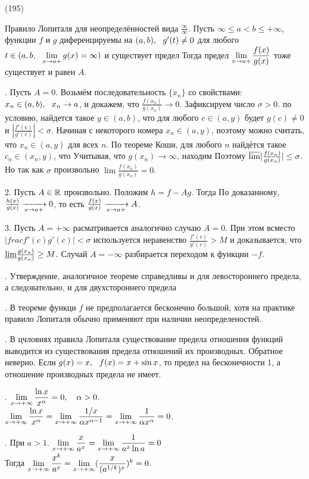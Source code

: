(195)

\T \q Правило Лопиталя для неопределённостей вида $\frac \infty\infty$. Пусть $\infty \le a < b \le +\infty$, функции $f$ и $g$ диференцируемы на $(a, b),\ \  g'(t) \neq 0$ для любого $t \in (a, b,\ \  \displaystyle \lim\limits^{}_{x \to a+}g(x) = \infty)$ и существует предел  Тогда предел $\displaystyle \lim\limits^{}_{x \to a+} \frac{f(x)}{g(x)}$ тоже существует и равен $A$.

. Пусть $A = 0$. Возьмём последовательность $\{x_n\}$ со свойствами: $x_n \in (a, b),\ \  x_n \to a$, и докажем, что $\frac{f(x_n)}{g(x_n)}\to 0$. Зафиксируем число $\sigma > 0$. по условию, найдется такое $y \in (a, b)$, что для любого $c \in (a, y)$ будет $g(c)\neq 0$ и $|\frac{f'(с)}{g'(c)}| < \sigma$. Начиная с некоторого номера $x_n \in (a, y)$, поэтому можно считать, что $x_n \in (a, y)$ для всех $n$. По теореме Коши, для любого $n$ найдётся такое $c_n \in (x_n, y)$, что
 Учитывая, что $g(x_n) \to \infty$, находим  Поэтому $\overline{\lim} |\frac{f(x_n)}{g(x_n)}| \le \sigma$. Но так как $\sigma$ произвольно $\lim\frac{f(x_n)}{g(x_n)} = 0$.

2. Пусть $A \in \mathbb{R}$ произвольно. Положим $h = f - Ag$. Тогда  По доказанному, $\frac{h(x)}{g(x)} \xrightarrow[x\to a+]{} 0$, то есть $\frac{f(x)}{g(x)} \xrightarrow[x\to a+]{} A$.

3. Пусть $A = +\infty$ расматривается аналогично случаю $A = 0$. При этом всместо $|frac{f'(c)}{g'(c)}| < \sigma$ используется неравенство $\frac{f'(c)}{g'(c)} > M$ и доказывается, что $\underline{\lim} \frac{g(x_n)}{g(x_n)} \ge M$. Случай $A = -\infty$ разбирается переходом к функции $-f$.

. Утверждение, аналогичное теореме справедливы и для левостороннего предела, а следовательно, и для двухстороннего предела

. В теореме функци $f$ не предполагается бесконечно большой, хотя на практике правило Лопиталя обычно применяют при наличии неопределеностей.

. В цчловиях правила Лопиталя существование предела отношения функций выводится из существования предела отношений их производных. Обратное неверно. Если $g(x) = x,\ \  f(x) = x + \sin x$, то предел на бесконечности 1, а отношение производных предела не имеет.

. $\displaystyle \lim\limits^{}_{x \to +\infty} \frac{\ln x}{x^\alpha} = 0,\quad \alpha > 0$.\\
$\displaystyle \lim\limits^{}_{x \to +\infty} \frac{\ln x}{x^\alpha} = \displaystyle \lim\limits^{}_{x \to +\infty} \frac{1/x}{\alpha x^{\alpha - 1}} = \displaystyle \lim\limits^{}_{x \to +\infty} \frac 1{\alpha x^\alpha} = 0$.

. При $a > 1$. $\displaystyle \lim\limits^{}_{x \to +\infty} \frac x{a^x} = \displaystyle \lim\limits^{}_{x \to +\infty} \frac 1{a^x \ln a} = 0$\\
Тогда $\displaystyle \lim\limits^{}_{x \to +\infty} \frac{x^k}{a^x} = \displaystyle \lim\limits^{}_{x \to +\infty} (\frac{x}{(a^{1/k})^x})^k = 0$.